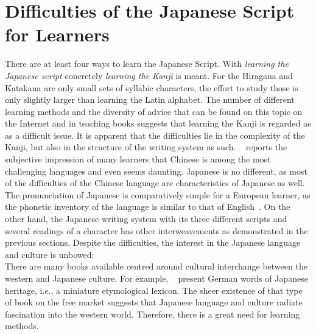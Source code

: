 \section{Difficulties of the Japanese Script for Learners}
\label{sec:japanesedifficulties}


There are at least four ways to learn the Japanese Script. 
With \emph{learning the Japanese script} concretely  \emph{learning the Kanji}
is meant. For the Hiragana and Katakana are only small sets of syllabic 
characters, the effort to study those is only slightly larger than learning 
the Latin alphabet. The number of different learning methods and the diversity 
of advice that can be found on this topic on the Internet and in teaching books 
suggests that learning the Kanji is regarded as as a difficult issue.
It is apparent that the difficulties lie in the complexity of the Kanji, 
but also in the structure of the writing system as such. 
~\citeyear{Stahlmann2004} reports the subjective 
impression of many learners that Chinese is among the most challenging languages
and even seems daunting. Japanese is no different, as most of the difficulties 
of the Chinese language are characteristics of Japanese as well. 
The pronunciation of Japanese is comparatively simple for a European learner, 
as the phonetic inventory of the language is similar to that of 
English~. On the other hand, the Japanese writing 
system with its three different scripts and several readings of a character 
has other interweavements as demonstrated in the previous sections.
Despite the difficulties, the interest in the Japanese language and 
culture is unbowed:\\
There are many books available centred around cultural interchange between
the western and Japanese culture. For example, 
~\citeyear{Haschke2008} present
German words of Japanese heritage, i.e., a miniature etymological lexicon.
The sheer existence of that type of book on the free market suggests that 
Japanese language and culture radiate fascination into the western world.
Therefore, there is a great need for learning methods.

